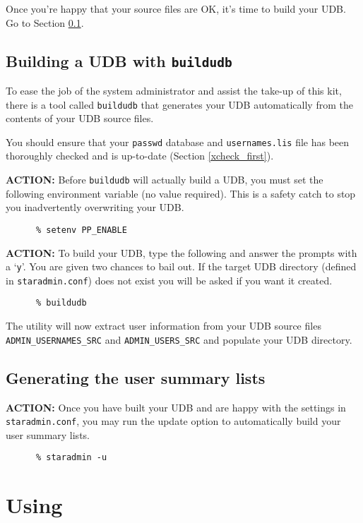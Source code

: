 Once you're happy that your source files are OK, it's time to build your UDB.
Go to Section \ref{buildudb}.

\subsection{Building a UDB with {\tt buildudb}}
\label{buildudb}

To ease the job of the system administrator and assist the take-up of this kit,
there is a tool called {\tt buildudb} that generates your UDB automatically
from the contents of your UDB source files.

You should ensure that your {\tt passwd} database and {\tt usernames.lis} file
has been thoroughly checked and is up-to-date (Section \ref{xcheck_first}).

{\large\bf ACTION:} Before {\tt buildudb} will actually build a UDB, you must
set the following environment variable (no value required). This is a safety
catch to stop you inadvertently overwriting your UDB.

\begin{verbatim}
      % setenv PP_ENABLE
\end{verbatim}

{\large\bf ACTION:} To build your UDB, type the following and answer the
prompts with a `{\tt y}'. You are given two chances to bail out. If the target
UDB directory (defined in {\tt staradmin.conf}) does not exist you will be
asked if you want it created.

\begin{verbatim}
      % buildudb
\end{verbatim}

The utility will now extract user information from your UDB source files
{\tt ADMIN\_USERNAMES\_SRC} and {\tt ADMIN\_USERS\_SRC}
and populate your UDB directory.

\subsection{Generating the user summary lists}

{\large\bf ACTION:} Once you have built your UDB and are happy with the
settings in {\tt staradmin.conf}, you may run the update option to
automatically build your  user summary lists.

\begin{verbatim}
      % staradmin -u
\end{verbatim}

\section{Using \staradmin}

